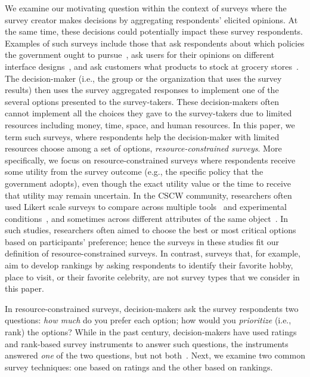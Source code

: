 {{We examine our motivating question within the context of surveys where the survey creator makes decisions by aggregating respondents' elicited opinions. At the same time, these decisions could potentially impact these survey respondents. Examples of such surveys include those that ask respondents about which policies the government ought to pursue~\cite{pew_spending}, ask users for their opinions on different interface designs~\cite{ledo2018evaluation}, and ask customers what products to stock at grocery stores~\cite{nielsen}. The decision-maker (i.e., the group or the organization that uses the survey results) then uses the survey aggregated responses to implement one of the several options presented to the survey-takers. These decision-makers often cannot implement all the choices they gave to the survey-takers due to limited resources including money, time, space, and human resources. In this paper, we term such surveys, where respondents help the decision-maker with limited resources choose among a set of options, \textit{resource-constrained surveys}. More specifically, we focus on resource-constrained surveys where respondents receive some utility from the survey outcome (e.g., the specific policy that the government adopts), even though the exact utility value or the time to receive that utility may remain uncertain. In the CSCW community, researchers often used Likert scale surveys to compare across multiple tools~\cite{zhang2017wikum} and experimental conditions~\cite{chang2017alpharead}, and sometimes across different attributes of the same object~\cite{cheng2017anyone, ma2017video}. In such studies, researchers often aimed to choose the best or most critical options based on participants' preference; hence the surveys in these studies fit our definition of resource-constrained surveys. In contrast, surveys that, for example, aim to develop rankings by asking respondents to identify their favorite hobby, place to visit, or their favorite celebrity, are not survey types that we consider in this paper. 

In resource-constrained surveys, decision-makers ask the survey respondents two questions: \textit{how much} do you prefer each option; how would you \textit{prioritize} (i.e., rank) the options? While in the past century, decision-makers have used ratings and rank-based survey instruments to answer such questions, the instruments answered \emph{one} of the two questions, but not both~\cite{moors2016two}.  Next, we examine two common survey techniques: one based on ratings and the other based on rankings.

}}
